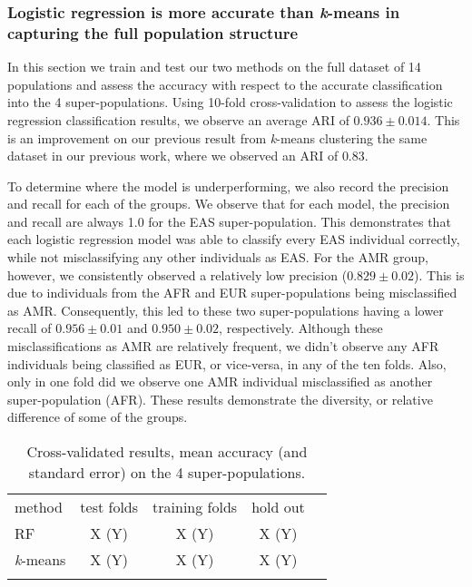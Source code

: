 \documentclass{llncs}
\newcommand{\kMeans}{\textit{k}-means}
\begin{document}
{\subsubsection{Logistic regression is more accurate than \kMeans{} in capturing the full population structure}
In this section we train and test our two methods on the full dataset of 14 populations and assess the accuracy with respect to the accurate
classification into the 4 super-populations.
Using 10-fold cross-validation to assess the logistic regression classification results, we observe an average ARI of \(0.936 \pm{} 0.014\).
This is an improvement on our previous result from \kMeans{} clustering the same dataset in our previous work, where we observed an ARI of \(0.83\).

To determine where the model is underperforming, we also record the precision and recall for each of the groups.
We observe that for each model, the precision and recall are always 1.0 for the EAS super-population.
This demonstrates that each logistic regression model was able to classify every EAS individual correctly, while not misclassifying any other individuals as EAS.
For the AMR group, however, we consistently observed a relatively low precision (\(0.829 \pm{} 0.02 \)).
This is due to individuals from the AFR and EUR super-populations being misclassified as AMR.
Consequently, this led to these two super-populations having a lower recall of \(0.956 \pm 0.01 \) and \(0.950 \pm 0.02 \), respectively.
Although these misclassifications as AMR are relatively frequent, we didn't observe any AFR individuals being classified as EUR, or vice-versa, in any of the ten folds.
Also, only in one fold did we observe one AMR individual misclassified as another super-population (AFR).
These results demonstrate the diversity, or relative difference of some of the groups. 

 

\begin{table}
\caption{Cross-validated results, mean accuracy (and standard error) on the 4 super-populations.}
\begin{center}
\renewcommand{\arraystretch}{1.4}
\setlength\tabcolsep{3pt}
\begin{tabular}{lcccc}
\hline\noalign{\smallskip}
method  & test folds & training folds & hold out \\
RF  & X (Y) & X (Y) & X (Y) \\
\kMeans & X (Y) & X (Y) & X (Y) \\
\noalign{\smallskip}
\hline
\end{tabular}
\end{center}
\end{table}







}
\end{document}
